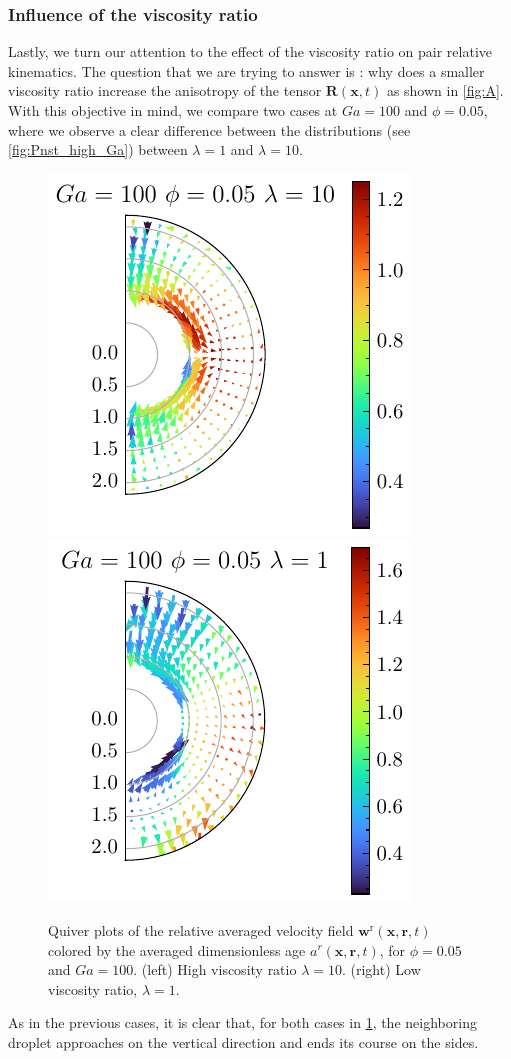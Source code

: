 \subsubsection{Influence of the viscosity ratio}

Lastly, we turn our attention to the effect of the viscosity ratio on pair relative kinematics. 
The question that we are trying to answer is : why does a smaller viscosity ratio increase the anisotropy of the tensor $\textbf{R}(\textbf{x},t)$ as shown in \ref{fig:A}. 
With this objective in mind, we compare two cases at $Ga = 100$ and $\phi =0.05$, where we observe a clear difference between the distributions (see \ref{fig:Pnst_high_Ga}) between $\lambda = 1$ and $\lambda = 10$.
\begin{figure}[h!]
    \centering
    \includegraphics[height=0.35\textwidth]{image/HOMOGENEOUS_NEW/Dist/U_rel_l_10_Ga_100_PHI_5.pdf}
    \includegraphics[height=0.35\textwidth]{image/HOMOGENEOUS_NEW/Dist/U_rel_l_1_Ga_100_PHI_5.pdf}
    \caption{Quiver plots of the relative averaged velocity field $\textbf{w}^\text{r}(\textbf{x},\textbf{r},t)$ colored by the averaged dimensionless age $a^r(\textbf{x},\textbf{r},t)$, for $\phi = 0.05$ and $Ga = 100$. 
    (left) High viscosity ratio $\lambda = 10$.
    (right) Low viscosity ratio, $\lambda = 1$. }
    \label{fig:Why_l_matter}
\end{figure}
As in the previous cases, it is clear that, for both cases in \ref{fig:Why_l_matter}, the neighboring droplet approaches on the vertical direction and ends its course on the sides.
